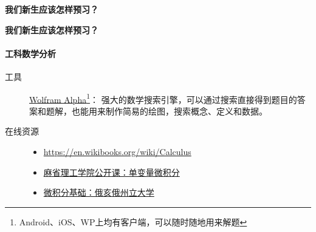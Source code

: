 \documentclass[presentation]{beamer}
\begin{document}
\begin{CJK*}{UTF8}{gbsn}
\begin{frame}{\textbf{我们新生应该怎样预习？}}
\begin{description}
\end{description}
\end{frame}

\begin{frame}{\textbf{我们新生应该怎样预习？}}
\framesubtitle{工科数学分析}
\begin{description}
 \item[工具] \href{http://www.wolframalpha.com/}{Wolfram Alpha}\footnote{Android、iOS、WP上均有客户端，可以随时随地用来解题}： 强大的数学搜索引擎，可以通过搜索直接得到题目的答案和题解，也能用来制作简易的绘图，搜索概念、定义和数据。
 \item[在线资源] \begin{itemize}
 \item \url{https://en.wikibooks.org/wiki/Calculus}
 \item \href{http://open.163.com/special/sp/singlevariablecalculus.html}{麻省理工学院公开课：单变量微积分}
 \item \href{https://www.coursera.org/learn/calculus1}{微积分基础：俄亥俄州立大学} 
 
 \end{itemize}
\end{description}
\end{frame}
\end{CJK*}
\end{document}
